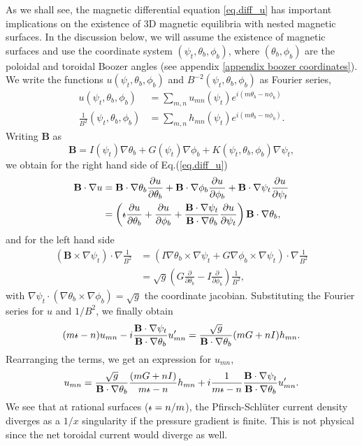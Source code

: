 \documentclass[my_thesis.tex]{subfiles}
\begin{document}
As we shall see, the magnetic differential equation \ref{eq.diff_u} has important implications on the existence of 3D magnetic equilibria with nested magnetic surfaces. In the discussion below, we will assume the existence of magnetic surfaces and use the coordinate system $(\psi_t,\theta_b,\phi_b)$, where $(\theta_b,\phi_b)$ are the poloidal and toroidal Boozer angles (see appendix \ref{appendix boozer coordinates}). We write the functions $u(\psi_t,\theta_b,\phi_b)$ and $B^{-2}(\psi_t,\theta_b,\phi_b)$ as Fourier series,
\begin{align}
	u(\psi_t,\theta_b,\phi_b) &= \sum_{m,n} u_{mn}(\psi_t) e^{i(m\theta_b-n\phi_b)}\\
	\frac{1}{B^2}(\psi_t,\theta_b,\phi_b) &= \sum_{m,n} h_{mn}(\psi_t) e^{i(m\theta_b-n\phi_b)}.
\end{align}
Writing $\mathbf{B}$ as
\begin{equation}
	\mathbf{B} = I(\psi_t)\nabla\theta_b + G(\psi_t)\nabla\phi_b + K(\psi_t,\theta_b,\phi_b)\nabla\psi_t,
\end{equation}
we obtain for the right hand side of Eq.(\ref{eq.diff_u})
\begin{align}
	\mathbf{B}\cdot\nabla u &= \mathbf{B}\cdot\nabla\theta_b\frac{\partial u}{\partial \theta_b} + \mathbf{B}\cdot\nabla\phi_b\frac{\partial u}{\partial \phi_b} + \mathbf{B}\cdot\nabla\psi_t\frac{\partial u}{\partial \psi_t} \\
	&= \left(\text{$\iota\!\!$-} \frac{\partial u}{\partial \theta_b} + \frac{\partial u}{\partial \phi_b} + \frac{\mathbf{B}\cdot\nabla\psi_t}{\mathbf{B}\cdot\nabla\theta_b}\frac{\partial u}{\partial\psi_t}\right)\mathbf{B}\cdot\nabla\theta_b,
\end{align}
and for the left hand side
\begin{align}
	\left(\mathbf{B}\times\nabla\psi_t\right)\cdot\nabla \frac{1}{B^2} &= \left(I\nabla\theta_b\times\nabla\psi_t + G\nabla\phi_b\times\nabla\psi_t\right)\cdot\nabla\frac{1}{B^2}\\
	&= \sqrt{g}\left(G\frac{\partial}{\partial\theta_b} - I \frac{\partial}{\partial \phi_b}\right)\frac{1}{B^2},
\end{align}
with $\nabla\psi_t\cdot(\nabla\theta_b\times\nabla\phi_b) = \sqrt{g}$ the coordinate jacobian. Substituting the Fourier series for $u$ and $1/B^2$, we finally obtain
\begin{equation}
	(m\text{$\iota\!\!$-} - n)u_{mn} - i \frac{\mathbf{B}\cdot\nabla\psi_t}{\mathbf{B}\cdot\nabla\theta_b} u'_{mn} = \frac{\sqrt{g}}{\mathbf{B}\cdot\nabla\theta_b}(mG + nI)h_{mn}.
\end{equation}
Rearranging the terms, we get an expression for $u_{mn}$,
\begin{equation}
	u_{mn} = \frac{\sqrt{g}}{\mathbf{B}\cdot\nabla\theta_b}\frac{(mG + nI)}{m\text{$\iota\!\!$-} - n}h_{mn} + i \frac{1}{m\text{$\iota\!\!$-}-n}\frac{\mathbf{B}\cdot\nabla\psi_t}{\mathbf{B}\cdot\nabla\theta_b} u'_{mn}.
\end{equation}
We see that at rational surfaces ($\text{$\iota\!\!$-}=n/m$), the Pfirsch-Schl\"uter current density diverges as a $1/x$ singularity if the pressure gradient is finite. This is not physical since the net toroidal current would diverge as well.
\end{document}
